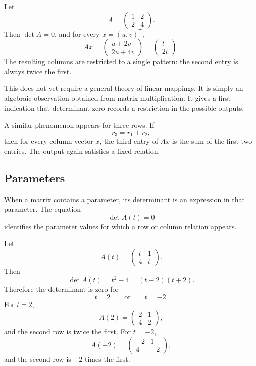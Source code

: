 \begin{examplebox}
Let
\[
A=\begin{pmatrix}1&2\\2&4\end{pmatrix}.
\]
Then \(\det A=0\), and for every \(x=(u,v)^{\mathsf T}\),
\[
Ax=
\begin{pmatrix}u+2v\\2u+4v\end{pmatrix}
=
\begin{pmatrix}t\\2t\end{pmatrix}.
\]
The resulting columns are restricted to a single pattern: the second entry is always twice the first.
\end{examplebox}

This does not yet require a general theory of linear mappings. It is simply an algebraic observation obtained from matrix multiplication. It gives a first indication that determinant zero records a restriction in the possible outputs.

A similar phenomenon appears for three rows. If
\[
r_3=r_1+r_2,
\]
then for every column vector \(x\), the third entry of \(Ax\) is the sum of the first two entries. The output again satisfies a fixed relation.

\subsection{Parameters}

When a matrix contains a parameter, its determinant is an expression in that parameter. The equation
\[
\det A(t)=0
\]
identifies the parameter values for which a row or column relation appears.

\begin{examplebox}
Let
\[
A(t)=\begin{pmatrix}t&1\\4&t\end{pmatrix}.
\]
Then
\[
\det A(t)=t^2-4=(t-2)(t+2).
\]
Therefore the determinant is zero for
\[
t=2\qquad\text{or}\qquad t=-2.
\]
For \(t=2\),
\[
A(2)=\begin{pmatrix}2&1\\4&2\end{pmatrix},
\]
and the second row is twice the first. For \(t=-2\),
\[
A(-2)=\begin{pmatrix}-2&1\\4&-2\end{pmatrix},
\]
and the second row is \(-2\) times the first.
\end{examplebox}

